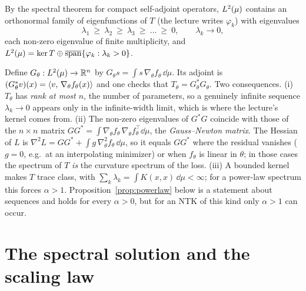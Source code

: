 By the spectral theorem for compact self-adjoint operators, $L^2(\mu)$ contains an orthonormal family of eigenfunctions of $T$ (the lecture writes $\varphi_k$) with eigenvalues
\[
   \lambda_1\ \ge\ \lambda_2\ \ge\ \lambda_3\ \ge\ \dots\ \ge\ 0,\qquad \lambda_k\to0,
\]
each non-zero eigenvalue of finite multiplicity, and $L^2(\mu)=\ker T\oplus\overline{\operatorname{span}}\{\varphi_k:\lambda_k>0\}$.

\begin{beyond}
Define $G_\theta:L^2(\mu)\to\mathbb{R}^n$ by $G_\theta s=\int s\,\nabla_\theta f_\theta\,\dd\mu$. Its adjoint is $(G_\theta^*v)(x)=\left\langle v,\,\nabla_\theta f_\theta(x)\right\rangle$ and one checks that $T_\theta=G_\theta^*G_\theta$. Two consequences.
(i) $T_\theta$ has \emph{rank at most $n$}, the number of parameters, so a genuinely infinite sequence $\lambda_k\to0$ appears only in the infinite-width limit, which is where the lecture's kernel comes from.
(ii) The non-zero eigenvalues of $G^*G$ coincide with those of the $n\times n$ matrix $GG^*=\int\nabla_\theta f_\theta\,\nabla_\theta f_\theta^{\!\top}\dd\mu$, the \emph{Gauss--Newton matrix}. The Hessian of $L$ is $\nabla^2L=GG^*+\int g\,\nabla_\theta^2f_\theta\,\dd\mu$, so it equals $GG^*$ where the residual vanishes ($g=0$, e.g.\ at an interpolating minimizer) or when $f_\theta$ is linear in $\theta$; in those cases the spectrum of $T$ \emph{is} the curvature spectrum of the loss.
(iii) A bounded kernel makes $T$ trace class, with $\sum_k\lambda_k=\int K(x,x)\,\dd\mu<\infty$; for a power-law spectrum this forces $\alpha>1$. Proposition~\ref{prop:powerlaw} below is a statement about sequences and holds for every $\alpha>0$, but for an NTK of this kind only $\alpha>1$ can occur.
\end{beyond}

\section{The spectral solution and the scaling law}\label{sec:L2-spectral}
